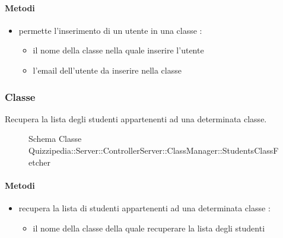 \paragraph{Metodi}
\begin{itemize}
\item {}
\newline
permette l'inserimento di un utente in una classe
\newline
{} :
\begin{itemize}
\item {}
\newline
il nome della classe nella quale inserire l'utente
\item {}
\newline
l'email dell'utente da inserire nella classe
\end{itemize}
\end{itemize}
\subsubsection{Classe }
Recupera la lista degli studenti appartenenti ad una determinata classe.
\begin{figure}[H]
\centering
\noindent{}
\caption[Schema Classe StudentsClassFetcher]{Schema Classe Quizzipedia::Server::ControllerServer::ClassManager::StudentsClassFetcher}
\end{figure}
\paragraph{Metodi}
\begin{itemize}
\item {}
\newline
recupera la lista di studenti appartenenti ad una determinata classe
\newline
{} :
\begin{itemize}
\item {}
\newline
il nome della classe della quale recuperare la lista degli studenti
\end{itemize}
\end{itemize}

